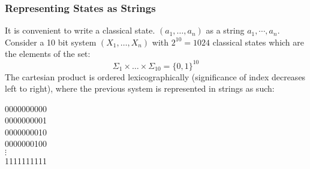 \documentclass[11pt]{scrartcl}
\begin{document}
\subsubsection{Representing States as Strings}
It is convenient to write a classical state. $(a_1, \dots ,a_n)$ as a string $a_1, \cdots ,a_n$.
Consider a 10 bit system $(X_1, \dots ,X_n)$ with $2^{10} = 1024$ classical states which are the elements of the set:
$$\Sigma_1 \times \dots \times \Sigma_{10} = \{0, 1\}^{10}$$The cartesian product is ordered lexicographically (significance of index decreases left to right), where
the previous system is represented in strings as such:
\begin{center}
	0000000000 \\
	0000000001 \\
	0000000010 \\
	0000000100 \\
	$\vdots$ \\
	1111111111
\end{center}
\end{document}
